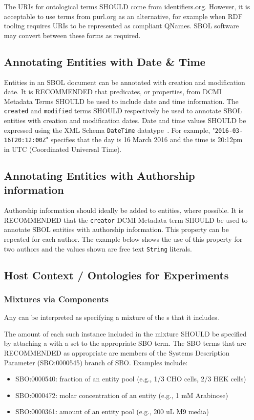 The URIs for ontological terms SHOULD come from identifiers.org.  However, it is acceptable to use terms from purl.org as an alternative, for example when RDF tooling requires URIs to be represented as compliant QNames.  SBOL software may convert between these forms as required.

\subsection{Annotating Entities with Date \& Time}\label{sec:DateTime}
Entities in an SBOL document can be annotated with creation and modification date. It is RECOMMENDED that predicates, or properties, from DCMI Metadata Terms SHOULD be used to include date and time information. The \texttt{created} and \texttt{modified} terms SHOULD respectively be used to annotate SBOL entities with creation and modification dates. Date and time values SHOULD be expressed using the XML Schema \texttt{DateTime} datatype~\citep{Biron2004}. For example, "\texttt{2016-03-16T20:12:00Z}" specifies that the day is 16 March 2016 and the time is 20:12pm in UTC (Coordinated Universal Time).

\subsection{Annotating Entities with Authorship information}\label{sec:Authorship}
Authorship information should ideally be added to  entities, where possible. It is RECOMMENDED that the \texttt{creator} DCMI Metadata term SHOULD be used to annotate SBOL entities with authorship information. This property can be repeated for each author. The example below shows the use of this property for two authors and the values shown are free text \texttt{String} literals.

\subsection{Host Context / Ontologies for Experiments}

\subsubsection{Mixtures via Components}

Any  can be interpreted as specifying a mixture of the s that it includes.

The amount of each such instance included in the mixture SHOULD be specified by attaching a  with a  set to the appropriate SBO term. The SBO terms that are RECOMMENDED as appropriate are members of the Systems Description Parameter (SBO:0000545) branch of SBO. Examples include:
\begin{itemize}
\item SBO:0000540: fraction of an entity pool (e.g., 1/3 CHO cells, 2/3 HEK cells)
\item SBO:0000472: molar concentration of an entity (e.g., 1 mM Arabinose)
\item SBO:0000361: amount of an entity pool (e.g., 200 uL M9 media)
\end{itemize}

